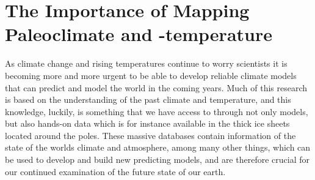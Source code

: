 \documentclass[../../CompleteThesis/Complete_1stDraft]{subfiles}
\begin{document}
	
	\section[Paleotemperature and -climate]{The Importance of Mapping Paleoclimate and -temperature}
	As climate change and rising temperatures continue to worry scientists it is becoming more and more urgent to be able to develop reliable climate models that can predict and model the world in the coming years. Much of this research is based on the understanding of the past climate and temperature, and this knowledge, luckily, is something that we have access to through not only models, but also hands-on data which is for instance available in the thick ice sheets located around the poles. These massive databases contain information of the state of the worlds climate and atmosphere, among many other things, which can be used to develop and build new predicting models, and are therefore crucial for our continued examination of the future state of our earth.
	
	
\end{document}
